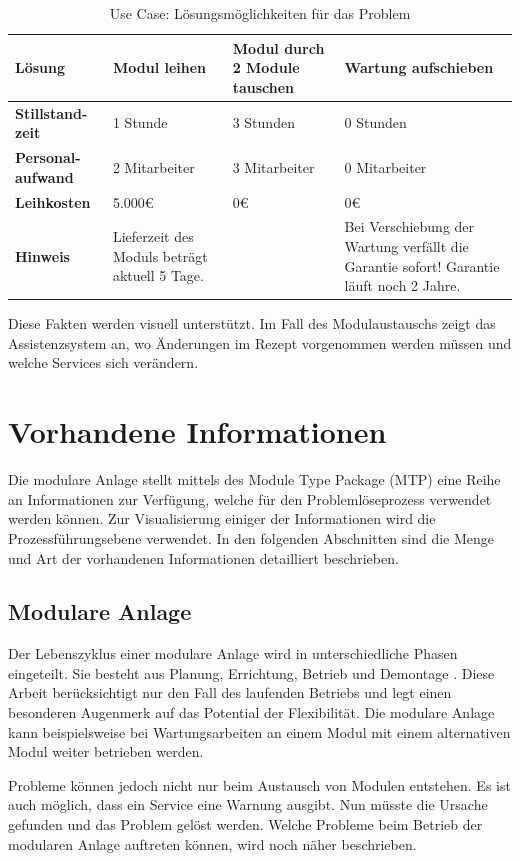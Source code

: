 \begin{table}[htb]
\centering
\caption{Use Case: Lösungsmöglichkeiten für das Problem}
\begin{tabular}{|p{}|p{}|p{}|p{}|}
\hline
\textbf{Lösung} & Modul leihen & Modul durch 2 Module tauschen & Wartung aufschieben \\
\hline
\textbf{Stillstand-zeit} & 1 Stunde & 3 Stunden & 0 Stunden \\
\hline
\textbf{Personal-aufwand	} & 2 Mitarbeiter & 3 Mitarbeiter & 0 Mitarbeiter \\
\hline
\textbf{Leihkosten} & 5.000€ & 0€ & 0€ \\
\hline
\textbf{Hinweis} & Lieferzeit des Moduls beträgt aktuell 5 Tage. & & Bei Verschiebung der Wartung verfällt die Garantie sofort! Garantie läuft noch 2 Jahre. \\
\hline
\end{tabular}
\label{tab:UseCase-Lösungen}
\end{table}
Diese Fakten werden visuell unterstützt. Im Fall des Modulaustauschs zeigt das Assistenzsystem an, wo Änderungen im Rezept vorgenommen werden müssen und welche Services sich verändern.

\section{Vorhandene Informationen}
Die modulare Anlage stellt mittels des Module Type Package (MTP) eine Reihe an Informationen zur Verfügung, welche für den Problemlöseprozess verwendet werden können. Zur Visualisierung einiger der Informationen wird die Prozessführungsebene verwendet. In den folgenden Abschnitten sind die Menge und Art der vorhandenen Informationen detailliert beschrieben. 

\subsection{Modulare Anlage}
Der Lebenszyklus einer modulare Anlage wird in unterschiedliche Phasen eingeteilt. Sie besteht aus Planung, Errichtung, Betrieb und Demontage \cite{Obst2013}. Diese Arbeit berücksichtigt nur den Fall des laufenden Betriebs und legt einen besonderen Augenmerk auf das Potential der Flexibilität. Die modulare Anlage kann beispielsweise bei Wartungsarbeiten an einem Modul mit einem alternativen Modul weiter betrieben werden.

Probleme können jedoch nicht nur beim Austausch von Modulen entstehen. Es ist auch möglich, dass ein Service eine Warnung ausgibt. Nun müsste die Ursache gefunden und das Problem gelöst werden. Welche Probleme beim Betrieb der modularen Anlage auftreten können, wird noch näher beschrieben.

